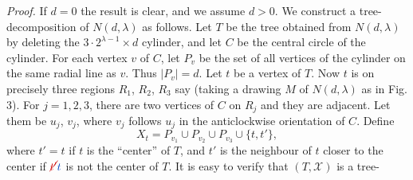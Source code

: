 \textit{Proof.} If $d = 0$ the result is clear, and we assume $d > 0$. We construct a tree-decomposition of $N(d, \lambda)$ as follows. Let $T$ be the tree obtained from $N(d, \lambda)$ by deleting the $3 \cdot 2^{\lambda-1} \times d$ cylinder, and let $C$ be the central circle of the cylinder. For each vertex $v$ of $C$, let $P_v$ be the set of all vertices of the cylinder on the same radial line as $v$. Thus $|P_v| = d$. Let $t$ be a vertex of $T$. Now $t$ is on precisely three regions $R_1$, $R_2$, $R_3$ say (taking a drawing $M$ of $N(d, \lambda)$ as in Fig. 3). For $j = 1, 2, 3$, there are two vertices of $C$ on $R_j$ and they are adjacent. Let them be $u_j$, $v_j$, where $v_j$ follows $u_j$ in the anticlockwise orientation of $C$. Define
\begin{equation*}
X_t = P_{v_1} \cup P_{v_2} \cup P_{v_3} \cup \{t, t'\},
\end{equation*}
where $t' = t$ if $t$ is the ``center'' of $T$, and $t'$ is the neighbour of $t$ closer to the center if $\delm{t'}\fix{t}$ is not the center of $T$. It is easy to verify that $(T, \mathcal{X})$ is a tree-
